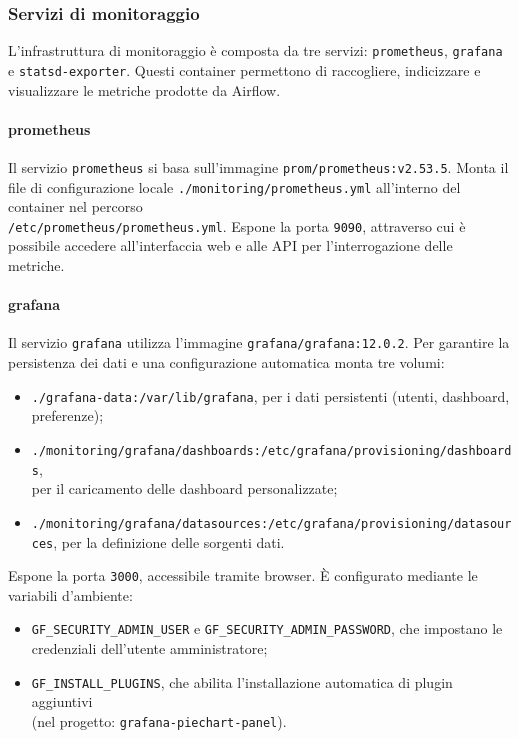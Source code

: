 \subsubsection{Servizi di monitoraggio}

L’infrastruttura di monitoraggio è composta da tre servizi: \texttt{prometheus}, \texttt{grafana} e \texttt{statsd-exporter}.  
Questi container permettono di raccogliere, indicizzare e visualizzare le metriche prodotte da Airflow.

\paragraph{prometheus}
Il servizio \texttt{prometheus} si basa sull’immagine \texttt{prom/prometheus:v2.53.5}.  
Monta il file di configurazione locale \texttt{./monitoring/prometheus.yml} all’interno del container nel percorso\\ \texttt{/etc/prometheus/prometheus.yml}.  
Espone la porta \texttt{9090}, attraverso cui è possibile accedere all’interfaccia web e alle API per l’interrogazione delle metriche.

\paragraph{grafana}
Il servizio \texttt{grafana} utilizza l’immagine \texttt{grafana/grafana:12.0.2}.  
Per garantire la persistenza dei dati e una configurazione automatica monta tre volumi:  
\begin{itemize}
    \item \texttt{./grafana-data:/var/lib/grafana}, per i dati persistenti (utenti, dashboard, preferenze);
    \item \texttt{./monitoring/grafana/dashboards:/etc/grafana/provisioning/dashboards},\\per il caricamento delle dashboard personalizzate;
    \item \texttt{./monitoring/grafana/datasources:/etc/grafana/provisioning/datasources}, per la definizione delle sorgenti dati.
\end{itemize}
Espone la porta \texttt{3000}, accessibile tramite browser.  
È configurato mediante le variabili d’ambiente:  
\begin{itemize}
    \item \texttt{GF\_SECURITY\_ADMIN\_USER} e \texttt{GF\_SECURITY\_ADMIN\_PASSWORD}, che impostano le credenziali dell’utente amministratore;
    \item \texttt{GF\_INSTALL\_PLUGINS}, che abilita l’installazione automatica di plugin aggiuntivi \\(nel progetto: \texttt{grafana-piechart-panel}).
\end{itemize}

